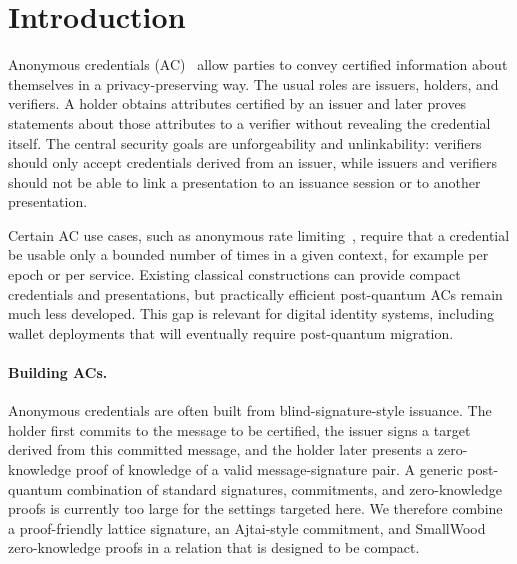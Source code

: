 \section{Introduction}
\label{sec:intro}

Anonymous credentials (AC)~\cite{chaum85-anonymous-credentials,EC:Brands95,EC:CamLys01} allow parties to
convey certified information about themselves in a privacy-preserving way.  The usual roles are issuers,
holders, and verifiers.  A holder obtains attributes certified by an issuer and later proves statements about
those attributes to a verifier without revealing the credential itself.  The central security goals are
unforgeability and unlinkability: verifiers should only accept credentials derived from an issuer, while issuers
and verifiers should not be able to link a presentation to an issuance session or to another presentation.

Certain AC use cases, such as anonymous rate limiting~\cite{ietf-privacypass-arc-protocol-01,schlesinger-cfrg-act-00},
require that a credential be usable only a bounded number of times in a given context, for example per
epoch or per service.  Existing classical constructions can provide compact credentials and presentations, but
practically efficient post-quantum ACs remain much less developed.  This gap is relevant for digital identity
systems, including wallet deployments that will eventually require post-quantum migration.

\paragraph*{Building ACs.}
Anonymous credentials are often built from blind-signature-style issuance.  The holder first commits to the
message to be certified, the issuer signs a target derived from this committed message, and the holder later
presents a zero-knowledge proof of knowledge of a valid message-signature pair.  A generic post-quantum
combination of standard signatures, commitments, and zero-knowledge proofs is currently too large for the
settings targeted here.  We therefore combine a proof-friendly lattice signature, an Ajtai-style commitment, and
SmallWood zero-knowledge proofs in a relation that is designed to be compact.

